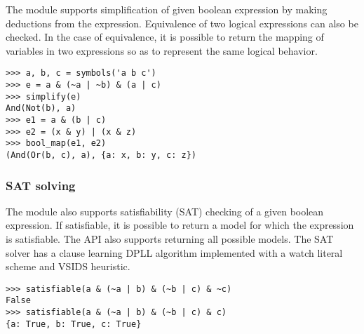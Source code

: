 The module supports simplification of given boolean expression by making
deductions from the expression. Equivalence of two logical expressions can also
be checked. In the case of equivalence, it is possible to return the mapping of
variables in two expressions so as to represent the same logical behavior.

\begin{verbatim}
>>> a, b, c = symbols('a b c')
>>> e = a & (~a | ~b) & (a | c)
>>> simplify(e)
And(Not(b), a)
>>> e1 = a & (b | c)
>>> e2 = (x & y) | (x & z)
>>> bool_map(e1, e2)
(And(Or(b, c), a), {a: x, b: y, c: z})
\end{verbatim}

\subsubsection{SAT solving}

The module also supports satisfiability (SAT) checking of a given boolean
expression. If satisfiable, it is possible to return a model for which the
expression is satisfiable. The API also supports returning all possible models.
The SAT solver has a clause learning DPLL algorithm implemented with a watch
literal scheme and VSIDS heuristic\cite{moskewicz2008method}.

\begin{verbatim}
>>> satisfiable(a & (~a | b) & (~b | c) & ~c)
False
>>> satisfiable(a & (~a | b) & (~b | c) & c)
{a: True, b: True, c: True}
\end{verbatim}
